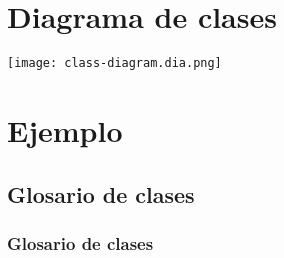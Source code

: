 \section{Diagrama de clases}
\texttt{[image: class-diagram.dia.png]}

\section{Ejemplo}
\subsection{Glosario de clases}
\subsubsection{Glosario de clases}
